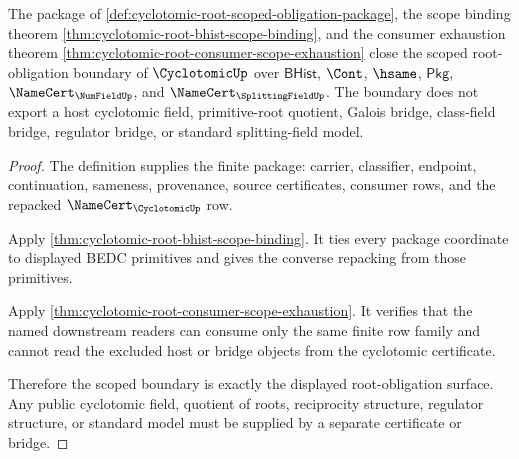 \begin{theorem}
\label{thm:cyclotomic-root-scoped-closure-boundary}
The package of \autoref{def:cyclotomic-root-scoped-obligation-package}, the
scope binding theorem
\autoref{thm:cyclotomic-root-bhist-scope-binding}, and the consumer exhaustion
theorem \autoref{thm:cyclotomic-root-consumer-scope-exhaustion} close the
scoped root-obligation boundary of $\CyclotomicUp$ over $\mathsf{BHist}$,
$\Cont$, $\hsame$, $\mathsf{Pkg}$, $\NameCert_{\NumFieldUp}$, and
$\NameCert_{\SplittingFieldUp}$. The boundary does not export a host
cyclotomic field, primitive-root quotient, Galois bridge, class-field bridge,
regulator bridge, or standard splitting-field model.
\end{theorem}
\begin{proof}
The definition supplies the finite package: carrier, classifier, endpoint,
continuation, sameness, provenance, source certificates, consumer rows, and the
repacked $\NameCert_{\CyclotomicUp}$ row.

Apply \autoref{thm:cyclotomic-root-bhist-scope-binding}. It ties every package
coordinate to displayed BEDC primitives and gives the converse repacking from
those primitives.

Apply \autoref{thm:cyclotomic-root-consumer-scope-exhaustion}. It verifies that
the named downstream readers can consume only the same finite row family and
cannot read the excluded host or bridge objects from the cyclotomic certificate.

Therefore the scoped boundary is exactly the displayed root-obligation
surface. Any public cyclotomic field, quotient of roots, reciprocity structure,
regulator structure, or standard model must be supplied by a separate
certificate or bridge.
\end{proof}
